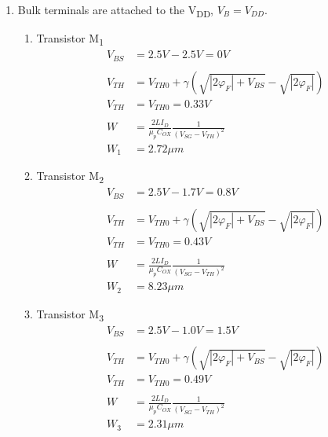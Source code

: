 \documentclass{article}
\begin{document}
\begin{enumerate}
\item Bulk terminals are attached to the V\textsubscript{DD}, \(V_{B} = V_{DD}\).
\begin{enumerate}
\item Transistor M\textsubscript{1}
\begin{equation*}
\begin{aligned}
V_{BS} &= 2.5 V - 2.5 V = 0 V \\
\\
V_{TH} &= V_{TH0} + \gamma{}(\sqrt{|2\varphi_{F}| + V_{BS}} - \sqrt{|2\varphi_{F}|}) \\
V_{TH} &= V_{TH0} = 0.33 V \\
\\
W &= \frac{2LI_{D}}{\mu_{p}C_{OX}}\frac{1}{(V_{SG} - V_{TH})^{2}} \\
W_{1} &= 2.72 \mu{}m
\end{aligned}
\end{equation*}

\item Transistor M\textsubscript{2}
\begin{equation*}
\begin{aligned}
V_{BS} &= 2.5 V - 1.7 V = 0.8 V \\
\\
V_{TH} &= V_{TH0} + \gamma{}(\sqrt{|2\varphi_{F}| + V_{BS}} - \sqrt{|2\varphi_{F}|}) \\
V_{TH} &= V_{TH0} = 0.43 V \\
\\
W &= \frac{2LI_{D}}{\mu_{p}C_{OX}}\frac{1}{(V_{SG} - V_{TH})^{2}} \\
W_{2} &= 8.23 \mu{}m
\end{aligned}
\end{equation*}

\item Transistor M\textsubscript{3}
\begin{equation*}
\begin{aligned}
V_{BS} &= 2.5 V - 1.0 V = 1.5 V \\
\\
V_{TH} &= V_{TH0} + \gamma{}(\sqrt{|2\varphi_{F}| + V_{BS}} - \sqrt{|2\varphi_{F}|}) \\
V_{TH} &= V_{TH0} = 0.49 V \\
\\
W &= \frac{2LI_{D}}{\mu_{p}C_{OX}}\frac{1}{(V_{SG} - V_{TH})^{2}} \\
W_{3} &= 2.31 \mu{}m
\end{aligned}
\end{equation*}
\end{enumerate}
\end{enumerate}
\end{document}
